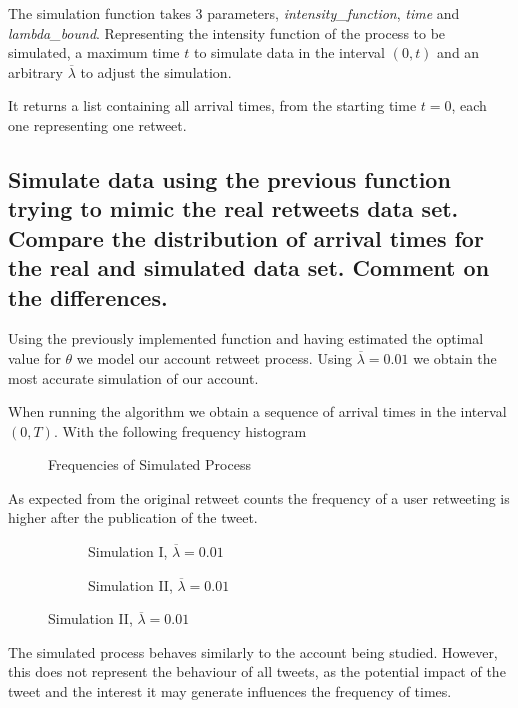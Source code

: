 The simulation function takes 3 parameters, \textit{intensity\_function}, \textit{time} and \textit{lambda\_bound}. Representing the intensity function of the process to be simulated, a maximum time $t$ to simulate data in the interval $(0, t)$ and an arbitrary $\overline \lambda$ to adjust the simulation.

It returns a list containing all arrival times, from the starting time $t=0$, each one representing one retweet. 

\subsection{Simulate data using the previous function trying to mimic the real retweets data set. Compare the distribution of arrival times for the real and simulated data set. Comment on the differences.}

Using the previously implemented function and having estimated the optimal value for $\theta$ we model our account retweet process. Using $\overline \lambda=0.01$ we obtain the most accurate simulation of our account.

When running the algorithm we obtain a sequence of arrival times in the interval $(0, T)$. With the following frequency histogram

\begin{figure}[H]
	\centering
	\vspace*{-3.5em}
	
	\vspace*{-1.5em}
	\caption{Frequencies of Simulated Process}
\end{figure}

As expected from the original retweet counts the frequency of a user retweeting is higher after the publication of the tweet. 

\begin{figure}[H]
	\centering
	\begin{subfigure}{.5\textwidth}
		\centering
		
		\caption{Simulation I, $\overline\lambda=0.01$}
		\label{fig:sim1}
	\end{subfigure}%
	\begin{subfigure}{.5\textwidth}
		\centering
		
		\caption{Simulation II, $\overline\lambda=0.01$}
		\label{fig:sim2}
	\end{subfigure}
\end{figure}

The simulated process behaves similarly to the account being studied. However, this does not represent the behaviour of all tweets, as the potential impact of the tweet and the interest it may generate influences the frequency of times.

